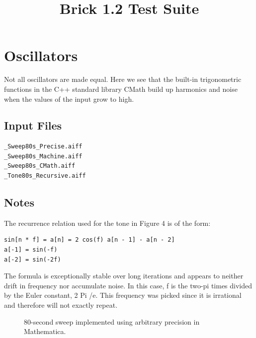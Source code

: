 \documentclass[10pt]{article}
\begin{document}
\title{Brick 1.2 Test Suite}
\author{}
\date{}
\maketitle

\section*{Oscillators}

Not all oscillators are made equal. Here we see that the built-in
          trigonometric functions in the C++ standard library CMath build up harmonics
          and noise when the values of the input grow to high.
        

\subsection*{Input Files}

\begin{verbatim}
_Sweep80s_Precise.aiff
_Sweep80s_Machine.aiff
_Sweep80s_CMath.aiff
_Tone80s_Recursive.aiff
\end{verbatim}

\subsection*{Notes}

The recurrence relation used for the tone in Figure 4 is of the form:

\begin{verbatim}
sin[n * f] = a[n] = 2 cos(f) a[n - 1] - a[n - 2]
a[-1] = sin(-f)
a[-2] = sin(-2f)
\end{verbatim}

The formula is exceptionally stable over long iterations and
          appears to neither drift in frequency nor accumulate noise. In this case, f is
          the two-pi times divided by the Euler constant, 2 Pi \slash  e. This frequency was picked since it is irrational and therefore will not exactly repeat.

\begin{figure} \begin{center} \setlength\fboxrule{0.01in}\end{center} \caption{80-second sweep implemented using arbitrary precision in Mathematica.} \end{figure}
\end{document}
